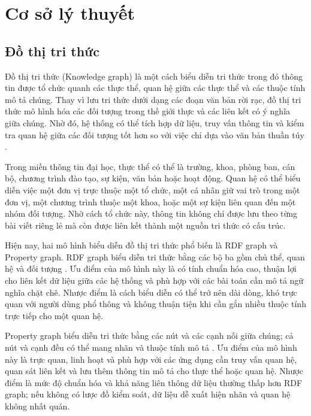 \chapter{Cơ sở lý thuyết}

\section{Đồ thị tri thức}

Đồ thị tri thức (Knowledge graph) là một cách biểu diễn tri thức trong đó thông tin được tổ chức quanh các thực thể, quan hệ giữa các thực thể và các thuộc tính mô tả chúng. Thay vì lưu tri thức dưới dạng các đoạn văn bản rời rạc, đồ thị tri thức mô hình hóa các đối tượng trong thế giới thực và các liên kết có ý nghĩa giữa chúng. Nhờ đó, hệ thống có thể tích hợp dữ liệu, truy vấn thông tin và kiểm tra quan hệ giữa các đối tượng tốt hơn so với việc chỉ dựa vào văn bản thuần túy \cite{hogan2021knowledge}.

Trong miền thông tin đại học, thực thể có thể là trường, khoa, phòng ban, cán bộ, chương trình đào tạo, sự kiện, văn bản hoặc hoạt động. Quan hệ có thể biểu diễn việc một đơn vị trực thuộc một tổ chức, một cá nhân giữ vai trò trong một đơn vị, một chương trình thuộc một khoa, hoặc một sự kiện liên quan đến một nhóm đối tượng. Nhờ cách tổ chức này, thông tin không chỉ được lưu theo từng bài viết riêng lẻ mà còn được liên kết thành một nguồn tri thức có cấu trúc.

Hiện nay, hai mô hình biểu diễn đồ thị tri thức phổ biến là RDF graph và Property graph. RDF graph biểu diễn tri thức bằng các bộ ba gồm chủ thể, quan hệ và đối tượng \cite{rdf11}. Ưu điểm của mô hình này là có tính chuẩn hóa cao, thuận lợi cho liên kết dữ liệu giữa các hệ thống và phù hợp với các bài toán cần mô tả ngữ nghĩa chặt chẽ. Nhược điểm là cách biểu diễn có thể trở nên dài dòng, khó trực quan với người dùng phổ thông và không thuận tiện khi cần gắn nhiều thuộc tính trực tiếp cho một quan hệ.

Property graph biểu diễn tri thức bằng các nút và các cạnh nối giữa chúng; cả nút và cạnh đều có thể mang nhãn và thuộc tính mô tả \cite{angles2018property}. Ưu điểm của mô hình này là trực quan, linh hoạt và phù hợp với các ứng dụng cần truy vấn quan hệ, quan sát liên kết và lưu thêm thông tin mô tả cho thực thể hoặc quan hệ. Nhược điểm là mức độ chuẩn hóa và khả năng liên thông dữ liệu thường thấp hơn RDF graph; nếu không có lược đồ kiểm soát, dữ liệu dễ xuất hiện nhãn và quan hệ không nhất quán.

